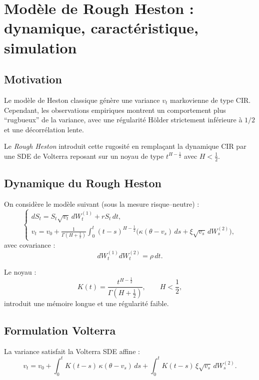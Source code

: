 \documentclass[11pt,a4paper]{article}
\newcommand{\1}{\mathbf{1}}
\begin{document}



\section{Mod\`ele de Rough Heston : dynamique, caract\'eristique, simulation}
\label{sec:deriv-rough-heston}

\subsection*{Motivation}

Le mod\`ele de Heston classique g\'enère une variance $v_t$ markovienne de type
CIR.
Cependant, les observations empiriques montrent un comportement plus ``rugbueux''
de la variance, avec une r\'egularité H\"older strictement inférieure à $1/2$ et
une d\'ecorrélation lente.

Le \emph{Rough Heston} introduit cette rugosit\'e en remplaçant la dynamique CIR
par une SDE de Volterra reposant sur un noyau de type $t^{H-\frac12}$ avec
$H<\frac12$.

\subsection*{Dynamique du Rough Heston}

On considère le modèle suivant (sous la mesure risque--neutre) :
\[
\begin{cases}
dS_t = S_t \sqrt{v_t}\, dW_t^{(1)} + r S_t\, dt, \\[6pt]
v_t = v_0 + \frac{1}{\Gamma(H+\tfrac12)}
      \int_0^t (t-s)^{H-\frac12}
      \bigl( \kappa(\theta - v_s)\, ds + \xi \sqrt{v_s}\, dW_s^{(2)} \bigr),
\end{cases}
\]
avec covariance :
\[
dW_t^{(1)} dW_t^{(2)} = \rho \, dt.
\]

Le noyau :
\[
K(t) = \frac{ t^{H-\frac12} }{\Gamma(H+\frac12)}, \qquad H<\frac12,
\]
introduit une m\'emoire longue et une r\'egularit\'e faible.

\subsection*{Formulation Volterra}

La variance satisfait la Volterra SDE affine :
\[
v_t = v_0 + \int_0^t K(t-s)\, \kappa(\theta - v_s)\, ds
      + \int_0^t K(t-s)\, \xi \sqrt{v_s}\, dW_s^{(2)}.
\]
\end{document}
